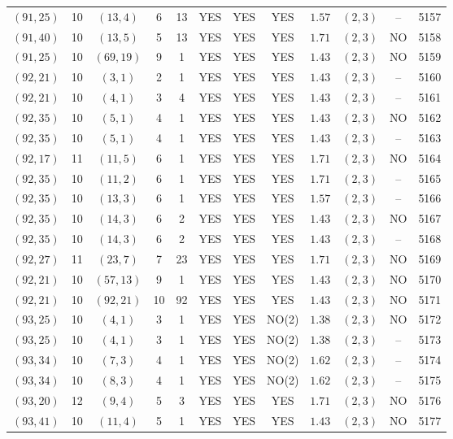 \begin{longtable}{|c|c|c|c|c|c|c|c|c|c|c|c|}
$(91,25)$ & 10 & $(13,4)$ & 6 & 13 & YES & YES & YES & $1.57$ & $(2,3)$ & -- & 5157\\
$(91,40)$ & 10 & $(13,5)$ & 5 & 13 & YES & YES & YES & $1.71$ & $(2,3)$ & NO & 5158\\
$(91,25)$ & 10 & $(69,19)$ & 9 & 1 & YES & YES & YES & $1.43$ & $(2,3)$ & NO & 5159\\
$(92,21)$ & 10 & $(3,1)$ & 2 & 1 & YES & YES & YES & $1.43$ & $(2,3)$ & -- & 5160\\
$(92,21)$ & 10 & $(4,1)$ & 3 & 4 & YES & YES & YES & $1.43$ & $(2,3)$ & -- & 5161\\
$(92,35)$ & 10 & $(5,1)$ & 4 & 1 & YES & YES & YES & $1.43$ & $(2,3)$ & NO & 5162\\
$(92,35)$ & 10 & $(5,1)$ & 4 & 1 & YES & YES & YES & $1.43$ & $(2,3)$ & -- & 5163\\
$(92,17)$ & 11 & $(11,5)$ & 6 & 1 & YES & YES & YES & $1.71$ & $(2,3)$ & NO & 5164\\
$(92,35)$ & 10 & $(11,2)$ & 6 & 1 & YES & YES & YES & $1.71$ & $(2,3)$ & -- & 5165\\
$(92,35)$ & 10 & $(13,3)$ & 6 & 1 & YES & YES & YES & $1.57$ & $(2,3)$ & -- & 5166\\
$(92,35)$ & 10 & $(14,3)$ & 6 & 2 & YES & YES & YES & $1.43$ & $(2,3)$ & NO & 5167\\
$(92,35)$ & 10 & $(14,3)$ & 6 & 2 & YES & YES & YES & $1.43$ & $(2,3)$ & -- & 5168\\
$(92,27)$ & 11 & $(23,7)$ & 7 & 23 & YES & YES & YES & $1.71$ & $(2,3)$ & NO & 5169\\
$(92,21)$ & 10 & $(57,13)$ & 9 & 1 & YES & YES & YES & $1.43$ & $(2,3)$ & NO & 5170\\
$(92,21)$ & 10 & $(92,21)$ & 10 & 92 & YES & YES & YES & $1.43$ & $(2,3)$ & NO & 5171\\
$(93,25)$ & 10 & $(4,1)$ & 3 & 1 & YES & YES & NO(2) & $1.38$ & $(2,3)$ & NO & 5172\\
$(93,25)$ & 10 & $(4,1)$ & 3 & 1 & YES & YES & NO(2) & $1.38$ & $(2,3)$ & -- & 5173\\
$(93,34)$ & 10 & $(7,3)$ & 4 & 1 & YES & YES & NO(2) & $1.62$ & $(2,3)$ & -- & 5174\\
$(93,34)$ & 10 & $(8,3)$ & 4 & 1 & YES & YES & NO(2) & $1.62$ & $(2,3)$ & -- & 5175\\
$(93,20)$ & 12 & $(9,4)$ & 5 & 3 & YES & YES & YES & $1.71$ & $(2,3)$ & NO & 5176\\
$(93,41)$ & 10 & $(11,4)$ & 5 & 1 & YES & YES & YES & $1.43$ & $(2,3)$ & NO & 5177\\

\end{longtable}
